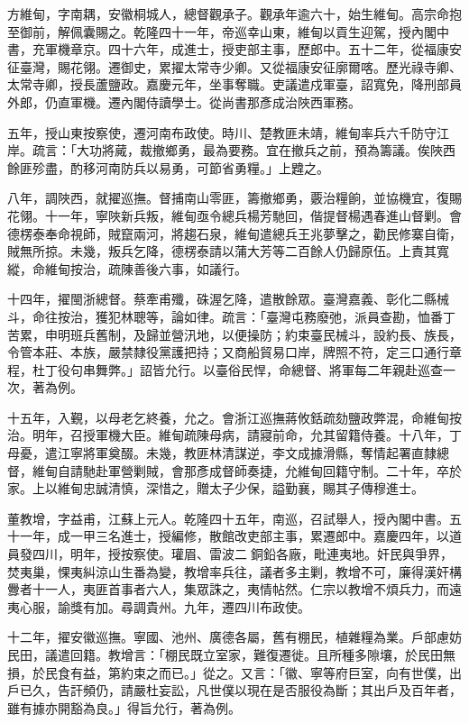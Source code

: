 \begin{pinyinscope}
方維甸，字南耦，安徽桐城人，總督觀承子。觀承年逾六十，始生維甸。高宗命抱至御前，解佩囊賜之。乾隆四十一年，帝巡幸山東，維甸以貢生迎駕，授內閣中書，充軍機章京。四十六年，成進士，授吏部主事，歷郎中。五十二年，從福康安征臺灣，賜花翎。遷御史，累擢太常寺少卿。又從福康安征廓爾喀。歷光祿寺卿、太常寺卿，授長蘆鹽政。嘉慶元年，坐事奪職。吏議遣戍軍臺，詔寬免，降刑部員外郎，仍直軍機。遷內閣侍讀學士。從尚書那彥成治陜西軍務。

五年，授山東按察使，遷河南布政使。時川、楚教匪未靖，維甸率兵六千防守江岸。疏言：「大功將蕆，裁撤鄉勇，最為要務。宜在撤兵之前，預為籌議。俟陜西餘匪殄盡，酌移河南防兵以易勇，可節省勇糧。」上韙之。

八年，調陜西，就擢巡撫。督捕南山零匪，籌撤鄉勇，覈治糧餉，並協機宜，復賜花翎。十一年，寧陜新兵叛，維甸亟令總兵楊芳馳回，偕提督楊遇春進山督剿。會德楞泰奉命視師，賊竄兩河，將趨石泉，維甸遣總兵王兆夢擊之，勸民修寨自衛，賊無所掠。未幾，叛兵乞降，德楞泰請以蒲大芳等二百餘人仍歸原伍。上責其寬縱，命維甸按治，疏陳善後六事，如議行。

十四年，擢閩浙總督。蔡牽甫殲，硃渥乞降，遣散餘眾。臺灣嘉義、彰化二縣械斗，命往按治，獲犯林聰等，論如律。疏言：「臺灣屯務廢弛，派員查勘，恤番丁苦累，申明班兵舊制，及歸並營汛地，以便操防；約束臺民械斗，設約長、族長，令管本莊、本族，嚴禁隸役黨護把持；又商船貿易口岸，牌照不符，定三口通行章程，杜丁役句串舞弊。」詔皆允行。以臺俗民悍，命總督、將軍每二年親赴巡查一次，著為例。

十五年，入覲，以母老乞終養，允之。會浙江巡撫蔣攸銛疏劾鹽政弊混，命維甸按治。明年，召授軍機大臣。維甸疏陳母病，請寢前命，允其留籍侍養。十八年，丁母憂，遣江寧將軍奠醊。未幾，教匪林清謀逆，李文成據滑縣，奪情起署直隸總督，維甸自請馳赴軍營剿賊，會那彥成督師奏捷，允維甸回籍守制。二十年，卒於家。上以維甸忠誠清慎，深惜之，贈太子少保，謚勤襄，賜其子傳穆進士。

董教增，字益甫，江蘇上元人。乾隆四十五年，南巡，召試舉人，授內閣中書。五十一年，成一甲三名進士，授編修，散館改吏部主事，累遷郎中。嘉慶四年，以道員發四川，明年，授按察使。瓘眉、雷波二銅鉛各廠，毗連夷地。奸民與爭界，焚夷巢，惈夷糾涼山生番為變，教增率兵往，議者多主剿，教增不可，廉得漢奸構釁者十一人，夷匪首事者六人，集眾誅之，夷情帖然。仁宗以教增不煩兵力，而遠夷心服，諭獎有加。尋調貴州。九年，遷四川布政使。

十二年，擢安徽巡撫。寧國、池州、廣德各屬，舊有棚民，植雜糧為業。戶部慮妨民田，議遣回籍。教增言：「棚民既立室家，難復遷徙。且所種多隙壤，於民田無損，於民食有益，第約束之而已。」從之。又言：「徽、寧等府巨室，向有世僕，出戶已久，告訐頻仍，請嚴杜妄訟，凡世僕以現在是否服役為斷；其出戶及百年者，雖有據亦開豁為良。」得旨允行，著為例。


\end{pinyinscope}
